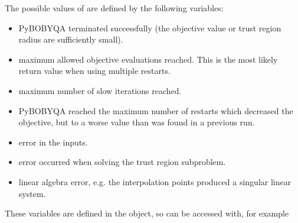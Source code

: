 \documentclass[letterpaper,10pt,english]{sphinxmanual}
\begin{document}
The possible values of  are defined by the following variables:
\begin{itemize}
\item {} 
 \sphinxhyphen{} Py\sphinxhyphen{}BOBYQA terminated successfully (the objective value or trust region radius are sufficiently small).

\item {} 
 \sphinxhyphen{} maximum allowed objective evaluations reached. This is the most likely return value when using multiple restarts.

\item {} 
 \sphinxhyphen{} maximum number of slow iterations reached.

\item {} 
 \sphinxhyphen{} Py\sphinxhyphen{}BOBYQA reached the maximum number of restarts which decreased the objective, but to a worse value than was found in a previous run.

\item {} 
 \sphinxhyphen{} error in the inputs.

\item {} 
 \sphinxhyphen{} error occurred when solving the trust region subproblem.

\item {} 
 \sphinxhyphen{} linear algebra error, e.g. the interpolation points produced a singular linear system.

\end{itemize}

These variables are defined in the  object, so can be accessed with, for example
\begin{quote}

\begin{sphinxVerbatim}[commandchars=\\\{\}]
   
\end{sphinxVerbatim}
\end{quote}
\end{document}
